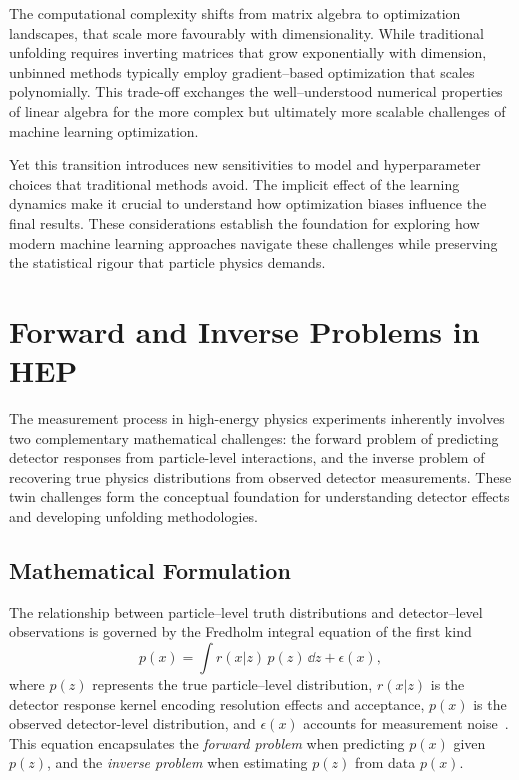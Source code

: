         The computational complexity shifts from matrix algebra to optimization landscapes, that scale more favourably with dimensionality.
        While traditional unfolding requires inverting matrices that grow exponentially with dimension, unbinned methods typically employ gradient--based optimization that scales polynomially.
        This trade-off exchanges the well--understood numerical properties of linear algebra for the more complex but ultimately more scalable challenges of machine learning optimization.

        Yet this transition introduces new sensitivities to model and hyperparameter choices that traditional methods avoid.
        The implicit effect of the learning dynamics make it crucial to understand how optimization biases influence the final results.
        These considerations establish the foundation for exploring how modern machine learning approaches navigate these challenges while preserving the statistical rigour that particle physics demands.

\section{Forward and Inverse Problems in HEP}
    The measurement process in high-energy physics experiments inherently involves two complementary mathematical challenges: the forward problem of predicting detector responses from particle-level interactions, and the inverse problem of recovering true physics distributions from observed detector measurements. These twin challenges form the conceptual foundation for understanding detector effects and developing unfolding methodologies.

\subsection{Mathematical Formulation}

The relationship between particle--level truth distributions and detector--level observations is governed by the Fredholm integral equation of the first kind~\cite{fredholm_sur_1903}
\begin{equation}
    p(x) = \int r(x|z)\,p(z) \, \dd z + \epsilon(x),
\end{equation}
where \(p(z)\) represents the true particle--level distribution, \(r(x|z)\) is the detector response kernel encoding resolution effects and acceptance, \(p(x)\) is the observed detector-level distribution, and \(\epsilon(x)\) accounts for measurement noise~\cite{weinberg_elementary_1963}.
%
This equation encapsulates the \emph{forward problem} when predicting \(p(x)\) given \(p(z)\), and the \textit{inverse problem} when estimating \(p(z)\) from data \(p(x)\).

